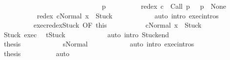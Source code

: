 \begin{isabellebody}
\ \ \ \ \ \ \isacommand{{\isacharbraceright}}\isamarkupfalse%
\isanewline
\ \ \ \ \ \ \isamarkupfalse%
\isanewline
\ \ \ \ \ \ \isacommand{{\isacharbraceleft}}\isamarkupfalse%
\isanewline
\ \ \ \ \ \ \ \ \isamarkupfalse%
\ p\isanewline
\ \ \ \ \ \ \ \ \isamarkupfalse%
\ {\isachardoublequoteopen}redex\ c\ {\isacharequal}\ Call\ p{\isachardoublequoteclose}\ \ {\isachardoublequoteopen}{\isasymGamma}\ p\ {\isacharequal}\ None{\isachardoublequoteclose}\isanewline
\ \ \ \ \ \ \ \ \isamarkupfalse%
\ {\isachardoublequoteopen}{\isasymGamma}{\isasymturnstile}\ {\isasymlangle}redex\ cNormal\ x{\isasymrangle}\ {\isasymRightarrow}\ Stuck{\isachardoublequoteclose}\isanewline
\ \ \ \ \ \ \ \ \ \ \isamarkupfalse%
\ {\isacharparenleft}auto\ intro{\isacharcolon}\ exec{\isachardot}intros{\isacharparenright}\isanewline
\ \ \ \ \ \ \ \ \isamarkupfalse%
\ exec{\isacharunderscore}redex{\isacharunderscore}Stuck\ {\isacharbrackleft}OF\ this{\isacharbrackright}\isanewline
\ \ \ \ \ \ \ \ \isamarkupfalse%
\ {\isachardoublequoteopen}{\isasymGamma}{\isasymturnstile}\ {\isasymlangle}cNormal\ x{\isasymrangle}\ {\isasymRightarrow}\ Stuck{\isachardoublequoteclose}\isacommand{{\isachardot}}\isamarkupfalse%
\isanewline
\ \ \ \ \ \ \ \ \isamarkupfalse%
\ \isamarkupfalse%
\ Stuck\ exec{\isacharprime}\ \isamarkupfalse%
\ {\isachardoublequoteopen}t{\isacharequal}Stuck{\isachardoublequoteclose}\isanewline
\ \ \ \ \ \ \ \ \ \ \isamarkupfalse%
\ {\isacharparenleft}auto\ intro{\isacharcolon}\ Stuck{\isacharunderscore}end{\isacharparenright}\isanewline
\ \ \ \ \ \ \ \ \isamarkupfalse%
\isanewline
\ \ \ \ \ \ \ \ \isamarkupfalse%
\ {\isacharquery}thesis\isanewline
\ \ \ \ \ \ \ \ \ \ \isamarkupfalse%
\ s{\isacharunderscore}Normal\isanewline
\ \ \ \ \ \ \ \ \ \ \isamarkupfalse%
\ {\isacharparenleft}auto\ intro{\isacharcolon}\ exec{\isachardot}intros{\isacharparenright}\isanewline
\ \ \ \ \ \ \isacommand{{\isacharbraceright}}\isamarkupfalse%
\isanewline
\ \ \ \ \ \ \isamarkupfalse%
\ \isamarkupfalse%
\ {\isacharquery}thesis\isanewline
\ \ \ \ \ \ \ \ \isamarkupfalse%
\ auto\isanewline
\ \ \ \ \isamarkupfalse%
\isanewline
\ \ \isamarkupfalse%

\end{isabellebody}
